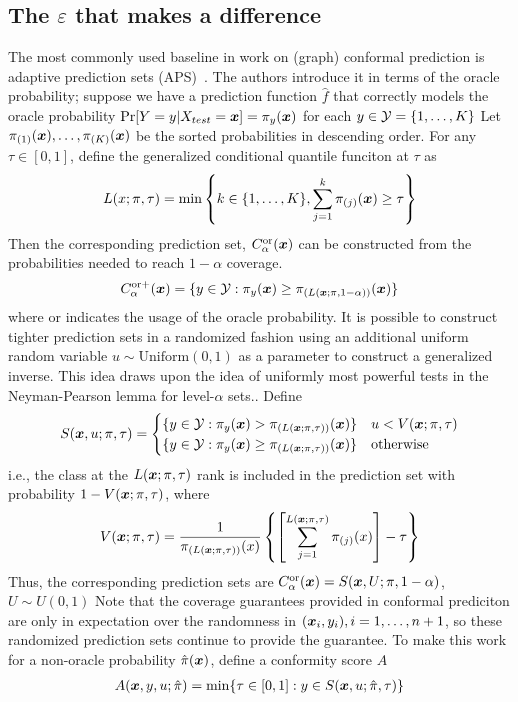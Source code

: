 \subsection{The $\varepsilon$ that makes a difference}
The most commonly used baseline in work on (graph) conformal prediction is adaptive prediction sets (APS)~\citep{romano2020classification}. 
The authors introduce it in terms of the oracle probability; suppose we have a prediction function $\hat{f}$ that correctly models the oracle probability $\Pr[Y=y|X_{test}={\bm{x}}] = \pi_y({\bm{x}})$ for each $y \in {\mathcal{Y}} = \{1, \dots, K\}$ 
Let $\pi_{(1)}({\bm{x}}), \dots, \pi_{(K)}({\bm{x}})$ be the sorted probabilities in descending order.
For any $\tau \in [0, 1]$, define the generalized conditional quantile funciton at $\tau$ as
\begin{align}
    L(x; \pi, \tau) =  \min\left\{ k \in \{1, \dots, K\}, \sum\limits_{j=1}^k \pi_{(j)}({\bm{x}}) \geq \tau \right\}
    \label{eq:APS:L}
\end{align}
Then the corresponding prediction set, $C_\alpha^{\text{or}}({\bm{x}})$ can be constructed from the probabilities needed to reach $1-\alpha$ coverage.
\[
    C_\alpha^{\text{or+}}({\bm{x}}) = \{y \in {\mathcal{Y}}: \pi_y({\bm{x}}) \geq \pi_{(L({\bm{x}}; \pi, 1-\alpha))}({\bm{x}})\}
\]
where $\text{or}$ indicates the usage of the oracle probability.
It is possible to construct tighter prediction sets in a randomized fashion using an additional uniform random variable $u \sim \text{Uniform}(0, 1)$ as a parameter to construct a generalized inverse. 
This idea draws upon the idea of uniformly most powerful tests in the Neyman-Pearson lemma for level-$\alpha$ sets.. 
Define
\begin{align}
    S({\bm{x}}, u; \pi, \tau) = \begin{cases}
        \{y \in {\mathcal{Y}}: \pi_y({\bm{x}}) > \pi_{(L({\bm{x}}; \pi, \tau))}({\bm{x}})\} & u < V({\bm{x}}; \pi, \tau) \\
        \{y \in {\mathcal{Y}}: \pi_y({\bm{x}}) \geq \pi_{(L({\bm{x}}; \pi, \tau))}({\bm{x}})\} & \text{otherwise}
    \end{cases}
    \label{eq:APS:S}    
\end{align}
i.e., the class at the $L({\bm{x}}; \pi, \tau)$ rank is included in the prediction set with probability $1 - V({\bm{x}}; \pi, \tau)$, where
\[
V({\bm{x}}; \pi, \tau) = \frac{1}{\pi_{(L({\bm{x}}; \pi, \tau))}(x)} \left\{ \left[\sum\limits_{j=1}^{L({\bm{x}}; \pi, \tau)}{\pi_{(j)}(x)} \right] - \tau \right\}
\]
Thus, the corresponding prediction sets are $C_\alpha^{\text{or}}({\bm{x}}) = S({\bm{x}}, U; \pi, 1 - \alpha)$, $U \sim U(0, 1)$
Note that the coverage guarantees provided in conformal prediciton are only in expectation over the randomness in $({\bm{x}}_i, y_i), i = 1, \dots, n+1$, so these randomized prediction sets continue to provide the guarantee.
To make this work for a non-oracle probability $\hat{\pi}({\bm{x}})$, define a conformity score $A$
\begin{align}
    A({\bm{x}}, y, u;\hat{\pi}) = \min\{\tau \in [0, 1]: y \in S({\bm{x}}, u; \hat{\pi}, \tau)\}
    \label{eq:APS:score}
\end{align}

